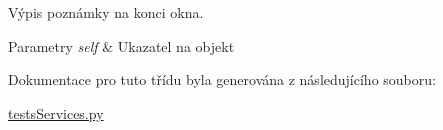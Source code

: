 Výpis poznámky na konci okna. 


\begin{DoxyParams}{Parametry}
{\em self} & Ukazatel na objekt \\
\hline
\end{DoxyParams}


Dokumentace pro tuto třídu byla generována z následujícího souboru\-:\begin{DoxyCompactItemize}
\item 
\hyperlink{testsServices_8py}{tests\-Services.\-py}\end{DoxyCompactItemize}
